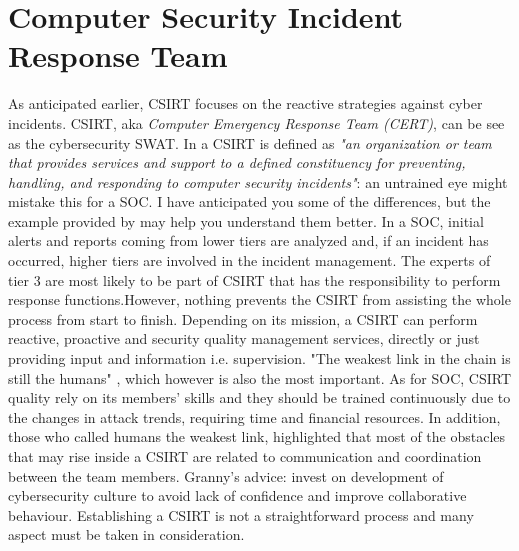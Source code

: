 \section{Computer Security Incident Response Team}
As anticipated earlier, CSIRT focuses on the reactive strategies against cyber incidents. CSIRT, aka \textit{Computer Emergency Response Team (CERT)}, can be see as the cybersecurity SWAT. In \cite{Mooi2015} a CSIRT is defined as \textit{"an organization or team that provides services and support to a defined constituency for preventing, handling, and responding to computer security incidents"}: an untrained eye might mistake this for a SOC. I have anticipated you some of the differences, but the example provided by \cite{Ruefle2014} may help you understand them better. In a SOC, initial alerts and reports coming from lower tiers are analyzed and, if an incident has occurred, higher tiers are involved in the incident management. The experts of tier 3 are most likely to be part of CSIRT that has the responsibility to perform response functions.\newline However, nothing prevents the CSIRT from assisting the whole process from start to finish. Depending on its mission, a CSIRT can perform reactive, proactive and security quality management services, directly or just providing input and information i.e. supervision. "The weakest link in the chain is still the humans" \cite{Ioannou2019}, which however is also the most important. As for SOC, CSIRT quality rely on its members' skills and they should be trained continuously due to the changes in attack trends, requiring time and financial resources. In addition, those who called humans the weakest link, highlighted that most of the obstacles that may rise inside a CSIRT are related to communication and coordination between the team members. Granny's advice: invest on development of cybersecurity culture to avoid lack of confidence and improve collaborative behaviour. Establishing a CSIRT is not a straightforward process and many aspect must be taken in consideration.
